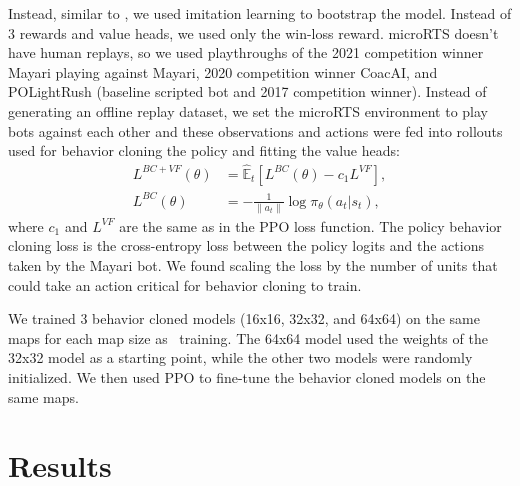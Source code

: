 \documentclass{article}
\begin{document}
Instead, similar to \citet{Vinyals2019GrandmasterLI}, we used imitation learning to
bootstrap the model. Instead of 3 rewards and value heads, we used only the win-loss
reward. microRTS doesn't have human replays, so we used playthroughs of the
2021 competition winner Mayari playing against Mayari, 2020 competition winner CoacAI, 
and POLightRush (baseline scripted bot and 2017 competition winner). Instead of
generating an offline replay dataset, we set the microRTS environment to play bots
against each other and these observations and actions were fed into rollouts used for
behavior cloning the policy and fitting the value heads:
\begin{align}
    L^{BC+VF}(\theta) &= \hat{\mathbb{E}}_t \left[ L^{BC}(\theta) - c_1 L^{VF} \right], \\
    L^{BC}(\theta) &= -\frac{1}{\|a_t\|} \log \pi_{\theta}(a_t|s_t),
\end{align}
where $c_1$ and $L^{VF}$ are the same as in the PPO loss function. The policy behavior
cloning loss is the cross-entropy loss between the policy logits and the actions taken
by the Mayari bot. We found scaling the loss by the number of units that could take an
action critical for behavior cloning to train.

We trained 3 behavior cloned models (16x16, 32x32, and 64x64) on the same maps for each
map size as \agentName\ training. The 64x64 model used the weights of the 32x32 model 
as a starting point, while the other two models were randomly initialized. We then used 
PPO to fine-tune the behavior cloned models on the same maps.

\section{Results}
\end{document}
